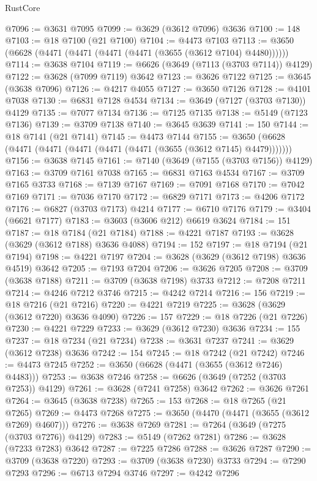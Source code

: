 \begin{lexlean}{RustCore}
\begin{coremodule}
@7096 := @3631 @7095
@7099 := @3629 (@3612 @7096) @3636
@7100 := 148
@7103 := @18 @7100 (@21 @7100)
@7104 := @4473 @7103
@7113 := @3650 (@6628 (@4471 (@4471 (@4471 (@4471 (@3655 (@3612 @7104) @4480))))))
@7114 := @3638 @7104
@7119 := @6626 (@3649 (@7113 (@3703 @7114)) @4129)
@7122 := @3628 (@7099 @7119) @3642
@7123 := @3626 @7122
@7125 := @3645 (@3638 @7096)
@7126 := @4217 @4055
@7127 := @3650 @7126
@7128 := @4101 @7038
@7130 := @6831 @7128 @4534
@7134 := @3649 (@7127 (@3703 @7130)) @4129
@7135 := @7077 @7134
@7136 := @7125 @7135
@7138 := @5149 (@7123 @7136)
@7139 := @3709 @7138
@7140 := @3645 @3639
@7141 := 150
@7144 := @18 @7141 (@21 @7141)
@7145 := @4473 @7144
@7155 := @3650 (@6628 (@4471 (@4471 (@4471 (@4471 (@4471 (@3655 (@3612 @7145) @4479)))))))
@7156 := @3638 @7145
@7161 := @7140 (@3649 (@7155 (@3703 @7156)) @4129)
@7163 := @3709 @7161 @7038
@7165 := @6831 @7163 @4534
@7167 := @3709 @7165 @3733
@7168 := @7139 @7167
@7169 := @7091 @7168
@7170 := @7042 @7169
@7171 := @7036 @7170
@7172 := @6829 @7171
@7173 := @4206 @7172
@7176 := @6827 (@3703 @7173) @4214
@7177 := @6710 @7176
@7179 := @3404 (@6621 @7177)
@7183 := @3603 (@3606 @212) @6619 @3624
@7184 := 151
@7187 := @18 @7184 (@21 @7184)
@7188 := @4221 @7187
@7193 := @3628 (@3629 (@3612 @7188) @3636 @4088)
@7194 := 152
@7197 := @18 @7194 (@21 @7194)
@7198 := @4221 @7197
@7204 := @3628 (@3629 (@3612 @7198) @3636 @4519) @3642
@7205 := @7193 @7204
@7206 := @3626 @7205
@7208 := @3709 (@3638 @7188)
@7211 := @3709 (@3638 @7198) @3733
@7212 := @7208 @7211
@7214 := @4246 @7212 @3746
@7215 := @4242 @7214
@7216 := 156
@7219 := @18 @7216 (@21 @7216)
@7220 := @4221 @7219
@7225 := @3628 (@3629 (@3612 @7220) @3636 @4090)
@7226 := 157
@7229 := @18 @7226 (@21 @7226)
@7230 := @4221 @7229
@7233 := @3629 (@3612 @7230) @3636
@7234 := 155
@7237 := @18 @7234 (@21 @7234)
@7238 := @3631 @7237
@7241 := @3629 (@3612 @7238) @3636
@7242 := 154
@7245 := @18 @7242 (@21 @7242)
@7246 := @4473 @7245
@7252 := @3650 (@6628 (@4471 (@3655 (@3612 @7246) @4483)))
@7253 := @3638 @7246
@7258 := @6626 (@3649 (@7252 (@3703 @7253)) @4129)
@7261 := @3628 (@7241 @7258) @3642
@7262 := @3626 @7261
@7264 := @3645 (@3638 @7238)
@7265 := 153
@7268 := @18 @7265 (@21 @7265)
@7269 := @4473 @7268
@7275 := @3650 (@4470 (@4471 (@3655 (@3612 @7269) @4607)))
@7276 := @3638 @7269
@7281 := @7264 (@3649 (@7275 (@3703 @7276)) @4129)
@7283 := @5149 (@7262 @7281)
@7286 := @3628 (@7233 @7283) @3642
@7287 := @7225 @7286
@7288 := @3626 @7287
@7290 := @3709 (@3638 @7220)
@7293 := @3709 (@3638 @7230) @3733
@7294 := @7290 @7293
@7296 := @6713 @7294 @3746
@7297 := @4242 @7296

\end{coremodule}
\end{lexlean}
